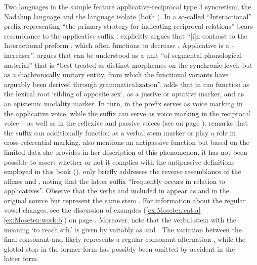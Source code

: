 Two languages in the sample feature applicative-reciprocal type 3 syncretism, the Nadahup language  and the language isolate  (both ). In  a so-called “Interactional” prefix  representing “the primary strategy for indicating reciprocal relations” \citep[487]{epps:2008} bears resemblance to the applicative suffix . \citet[500]{epps:2008} explicitly argues that “[i]n contrast to the Interactional preform , which often functions to decrease , Applicative  is a -increaser”. \citet[119f.]{epps:2008} argues that  can be understood as a unit “of segmental phonological material” that is “best treated as distinct morphemes on the synchronic level, but as a diachronically unitary entity, from which the functional variants have arguably been derived through grammaticalization”. \citeauthor{epps:2008} adds that  in  can function as the lexical root ‘sibling of opposite sex’, as a jussive or optative marker, and as an epistemic modality marker. In turn, in  the prefix  serves as voice marking in the applicative voice, while the suffix  can serve as voice marking in the reciprocal voice -- as well as in the reflexive and passive voices (see  on page \pageref{tab:ch4:pass-refl}). \citet[186, 190, 233ff.]{sakel:2004} remarks that the suffix  can additionally function as a verbal stem marker or play a role in cross-referential marking. \citet[311ff.]{sakel:2004} also mentions an antipassive function but based on the limited data she provides in her description of this phenomenon, it has not been possible to assert whether or not it complies with the antipassive definitions employed in this book (). \citet[233]{sakel:2004} only briefly addresses the reverse resemblance of the affixes  and , noting that the latter suffix “frequently occurs in relation to applicatives”. Observe that the  verbs  and  included in  appear as  and  in the original source but represent the same stem \citep[322]{sakel:2004}. For information about the regular vowel changes, see the discussion of examples (\ref{ex:Moseten:eat:a}--\ref{ex:Moseten:work:b}) on page \pageref{ex:Moseten:eat:a}. Moreover, note that the verbal stem with the meaning ‘to reach sth.’ is given by \citet[121, 391]{sakel:2004} variably as  and . The variation between the final consonant  and  likely represents a regular consonant alternation \citep[48f.]{sakel:2004}, while the glottal stop in the former form has possibly been omitted by accident in the latter form.


